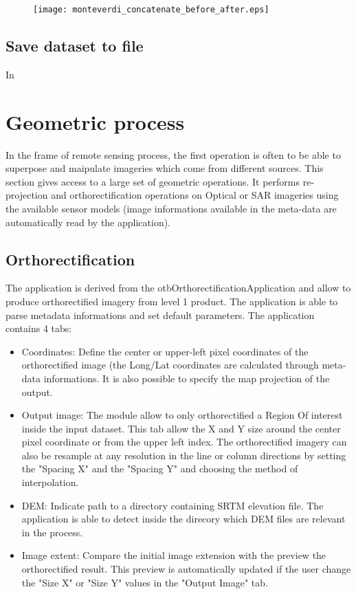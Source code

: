 \documentclass{InsightSoftwareGuide}
\begin{document}
\begin{figure}
   \center
   \texttt{[image: monteverdi\_concatenate\_before\_after.eps]}
   \label{fig:concatenate}
\end{figure}
 
\subsection{Save dataset to file}

In 

\section{Geometric process}
In the frame of remote sensing process, the first operation is often to be able to superpose and maipulate imageries which 
come from different sources.
This section gives access to a large set of geometric operations.
It performs re-projection and orthorectification operations on Optical or SAR imageries using the available sensor models 
(image informations available in the meta-data are automatically read by the application).  
\subsection{Orthorectification}
The application is derived from the otbOrthorectificationApplication and allow to produce orthorectified imagery from level 1 
product.
The application is able to parse metadata informations and set default parameters. The application contains 4 tabs:

\begin{itemize}
\item Coordinates: Define the center or upper-left pixel coordinates of the orthorectified image (the Long/Lat coordinates are 
calculated through meta-data informations. It is also possible to specify the map projection of the output.
\item Output image: The module allow to only orthorectified a Region Of interest inside the input dataset. This tab allow the X and Y size 
around the center pixel coordinate or from the upper left index. The orthorectified imagery can also be resample at any resolution in the
line or column directions by setting the "Spacing X" and the "Spacing Y" and choosing the method of interpolation.
\item DEM: Indicate path to a directory containing SRTM elevation file. The application is able to detect inside the direcory which 
DEM files are relevant in the process.
\item Image extent: Compare the initial image extension with the preview the orthorectified result. This preview is automatically 
updated if the user change the "Size X" or "Size Y" values in the "Output Image" tab.   
\end{itemize}
\end{document}
